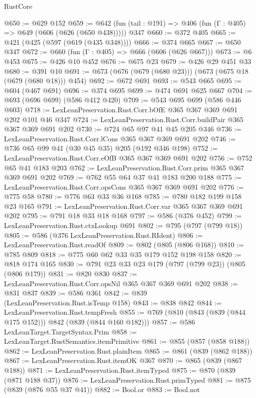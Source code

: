 \begin{lexlean}{RustCore}
\begin{coremodule}
@650 := @629 @152
@659 := @642 (fun (tail : @191) => @406 (fun (Γ : @405) => @649 (@606 (@626 (@650 @438))))) @347
@660 := @372 @405
@665 := @421 (@425 (@597 (@619 (@435 @348))))
@666 := @374 @665
@667 := @650 @347
@672 := @660 (fun (Γ : @405) => @666 (@606 (@626 @667)))
@673 := @6 @453
@675 := @426 @10 @452
@676 := @675 @23
@679 := @426 @29 @451 @33
@680 := @391 @10
@691 := @673 (@676 (@679 (@680 @23))) (@673 (@675 @18 (@679 (@680 @18))) @454)
@692 := @672 @691
@693 := @543 @665
@695 := @604 (@467 @691)
@696 := @374 @695
@699 := @474 @691 @625 @667
@704 := @693 (@696 @699) (@586 @412 @420)
@709 := @543 @695 @699 (@586 @446 @603)
@718 := LexLeanPreservation.Rust.Corr.bOfE @365 @367 @369 @691 @202 @101 @46 @347
@724 := LexLeanPreservation.Rust.Corr.buildPair @365 @367 @369 @691 @202
@730 := @724 @65 @97 @41 @45 @205 @346
@736 := LexLeanPreservation.Rust.Corr.lCons @365 @367 @369 @691 @202
@746 := @736 @65 @99 @41 (@30 @45 @35) @205 (@192 @346 @198)
@752 := LexLeanPreservation.Rust.Corr.eOfB @365 @367 @369 @691 @202
@756 := @752 @65 @41 @183 @203
@762 := LexLeanPreservation.Rust.Corr.prim @365 @367 @369 @691 @202
@769 := @762 @55 @64 @37 @41 @183 @200 @188
@775 := LexLeanPreservation.Rust.Corr.opsCons @365 @367 @369 @691 @202
@776 := @775 @58
@780 := @776 @63 @33 @36 @168
@785 := @780 @182 @199 @158 @23 @165
@791 := LexLeanPreservation.Rust.Corr.var @365 @367 @369 @691 @202
@795 := @791 @18 @33 @18 @168
@797 := @586 (@376 @452)
@799 := LexLeanPreservation.Rust.ctxLookup @691
@802 := @795 (@797 (@799 @18))
@805 := @586 (@376 LexLeanPreservation.Rust.RIdent)
@806 := LexLeanPreservation.Rust.readOf
@809 := @802 (@805 (@806 @168))
@810 := @785 @809
@818 := @775 @60 @62 @33 @35 @179 @152 @198 @158
@820 := @818 @174 @165
@830 := @791 @23 @33 @23 @179 (@797 (@799 @23)) (@805 (@806 @179))
@831 := @820 @830
@837 := LexLeanPreservation.Rust.Corr.opsNil @365 @367 @369 @691 @202
@838 := @831 @837
@839 := @586 @361
@842 := @839 (LexLeanPreservation.Rust.isTemp @158)
@843 := @838 @842
@844 := LexLeanPreservation.Rust.tempFresh
@855 := @769 (@810 (@843 (@839 (@844 @175 @152))) @842 (@839 (@844 @160 @182)))
@857 := @586 LexLeanTarget.TargetSyntax.Prim
@858 := LexLeanTarget.RustSemantics.itemPrimitive
@861 := @855 (@857 (@858 @188))
@862 := LexLeanPreservation.Rust.plainItem
@865 := @861 (@839 (@862 @188))
@867 := LexLeanPreservation.Rust.itemOK @367
@870 := @865 (@839 (@867 @188))
@871 := LexLeanPreservation.Rust.itemTyped
@875 := @870 (@839 (@871 @188 @37))
@876 := LexLeanPreservation.Rust.primTyped
@881 := @875 (@839 (@876 @55 @37 @41))
@882 := Bool.or
@883 := Bool.not

\end{coremodule}
\end{lexlean}
